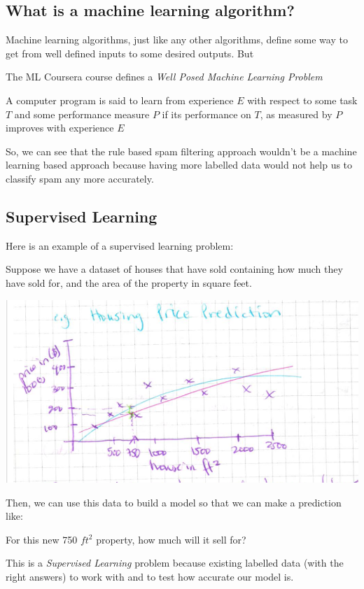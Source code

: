 \documentclass[12pt]{article}
\begin{document}
\subsection{What is a machine learning algorithm?}

Machine learning algorithms, just like any other algorithms, define some way to get from well defined inputs to some desired outputs. But

The ML Coursera course defines a \textit{Well Posed Machine Learning Problem}

A computer program is said to learn from experience $E$ with respect to some task $T$ and some performance measure $P$ 
if its performance on $T$, as measured by $P$ improves with experience $E$

So, we can see that the rule based spam filtering approach wouldn't be a machine learning based approach because having more labelled data would not help us to classify spam any more accurately.

\subsection{Supervised Learning}

Here is an example of a supervised learning problem: 

Suppose we have a dataset of houses that have sold containing how much they have sold for, and the area of the property in square feet. 

\includegraphics[width={\textwidth}]{housing-prices}

Then, we can use this data to build a model so that we can make a prediction like:

For this new 750 $ft^2$ property, how much will it sell for?

This is a \textit{Supervised Learning} problem because existing labelled data (with the right answers) to work with and to test how accurate our model is.
\end{document}

